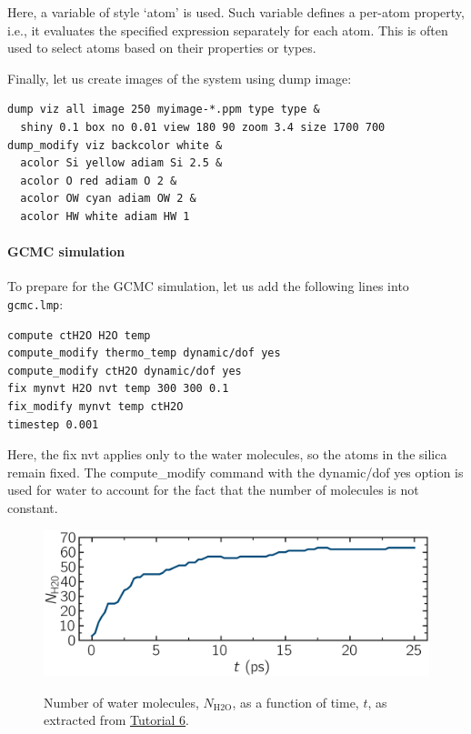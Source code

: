 \documentclass[9pt,tutorial]{livecoms}
\newcommand{\lmpcmd}[1]{\colorbox{listing}{\textcolor{command}{\small{#1}}}} %
\newcommand{\flecmd}[1]{\textcolor{command}{\texttt{#1}}} %
\begin{document}
\begin{note}
  Here, a variable of style `atom' is used.  Such variable
  defines a per-atom property, i.e., it evaluates the specified expression
  separately for each atom.  This is often used to select atoms based on
  their properties or types.
\end{note}

Finally, let us create images
of the system using \lmpcmd{dump image}:
\begin{lstlisting}
dump viz all image 250 myimage-*.ppm type type &
  shiny 0.1 box no 0.01 view 180 90 zoom 3.4 size 1700 700
dump_modify viz backcolor white &
  acolor Si yellow adiam Si 2.5 &
  acolor O red adiam O 2 &
  acolor OW cyan adiam OW 2 &
  acolor HW white adiam HW 1
\end{lstlisting}

\paragraph{GCMC simulation}

To prepare for the GCMC simulation, let us add the
following lines into \flecmd{gcmc.lmp}:
\begin{lstlisting}
compute ctH2O H2O temp
compute_modify thermo_temp dynamic/dof yes
compute_modify ctH2O dynamic/dof yes
fix mynvt H2O nvt temp 300 300 0.1
fix_modify mynvt temp ctH2O
timestep 0.001
\end{lstlisting}
Here, the \lmpcmd{fix nvt} applies only to the water molecules, so
the atoms in the silica remain fixed.  The \lmpcmd{compute\_modify} command with
the \lmpcmd{dynamic/dof yes} option is used for water to account for the fact
that the number of molecules is not constant.

\begin{figure}
\centering
\includegraphics[width=\linewidth]{GCMC-number}\\[-2ex]
\caption{Number of water molecules, $N_\text{H2O}$, as a function of time, $t$,
as extracted from \hyperref[gcmc-silica-label]{Tutorial 6}.}
\label{fig:GCMC-number}
\end{figure}
\end{document}
